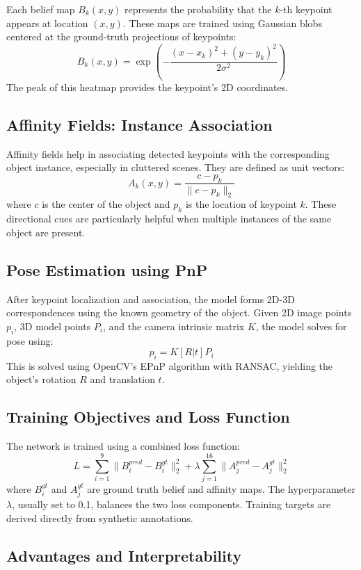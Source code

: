\documentclass[conference]{IEEEtran}
\begin{document}
Each belief map $B_k(x, y)$ represents the probability that the $k$-th keypoint appears at location $(x, y)$. These maps are trained using Gaussian blobs centered at the ground-truth projections of keypoints:
\[
B_k(x, y) = \exp\left(-\frac{(x - x_k)^2 + (y - y_k)^2}{2\sigma^2}\right)
\]
The peak of this heatmap provides the keypoint’s 2D coordinates.

\subsection{Affinity Fields: Instance Association}

Affinity fields help in associating detected keypoints with the corresponding object instance, especially in cluttered scenes. They are defined as unit vectors:
\[
A_k(x, y) = \frac{c - p_k}{\|c - p_k\|_2}
\]
where $c$ is the center of the object and $p_k$ is the location of keypoint $k$. These directional cues are particularly helpful when multiple instances of the same object are present.

\subsection{Pose Estimation using PnP}

After keypoint localization and association, the model forms 2D-3D correspondences using the known geometry of the object. Given 2D image points $p_i$, 3D model points $P_i$, and the camera intrinsic matrix $K$, the model solves for pose using:
\[
p_i = K [R | t] P_i
\]
This is solved using OpenCV’s EPnP algorithm with RANSAC, yielding the object's rotation $R$ and translation $t$.

\subsection{Training Objectives and Loss Function}

The network is trained using a combined loss function:
\[
L = \sum_{i=1}^9 \| B_i^{pred} - B_i^{gt} \|_2^2 + \lambda \sum_{j=1}^{16} \| A_j^{pred} - A_j^{gt} \|_2^2
\]
where $B_i^{gt}$ and $A_j^{gt}$ are ground truth belief and affinity maps. The hyperparameter $\lambda$, usually set to 0.1, balances the two loss components. Training targets are derived directly from synthetic annotations.

\subsection{Advantages and Interpretability}
\end{document}
